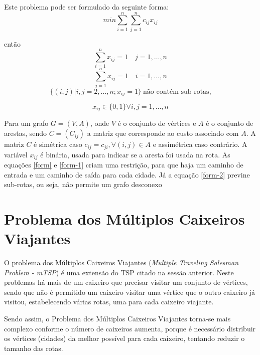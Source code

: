 \documentclass{abnt}
\begin{document}
		Este problema pode ser formulado da seguinte forma:
		\begin{equation}
 		   	min\sum_{i=1}^{n} \sum_{j=1}^{n} c_{ij} x_{ij}
		\end{equation}
		
		então		
		\begin{equation}
			\label{form}
 		   	\sum_{i=1}^{n} x_{ij} = 1 \quad j=1,\dots,n
		\end{equation}
		\begin{equation}
			\label{form-1}
 		   	\sum_{j=1}^{n} x_{ij} = 1 \quad i=1,\dots,n
		\end{equation}
		\begin{equation}
		\label{form-2}
 		   	\{(i,j)|i,j=2,\dots,n; x_{ij}=1\} ~\text{não contém sub-rotas,}
		\end{equation}
		
		\begin{equation}
		\label{form-3}
 		   	x_{ij} \in \{0,1\}\forall i,j=1,\dots,n
		\end{equation}
		
			
		Para um grafo  $G=(V,A)$, onde $V$ é o conjunto de vértices e $A$  é o conjunto de arestas, sendo $C = (C_{ij})$ a matriz que corresponde ao custo associado com $A$. A matriz $C$ é simétrica caso $c_{ij}=c_{ji},\forall(i,j) \in A$ e assimétrica caso contrário. A variável $x_{ij}$ é binária, usada para indicar se a aresta foi usada na rota. As equações \ref{form} e \ref{form-1} criam uma restrição, para que haja um caminho de entrada e um caminho de saída para cada cidade. Já a equação \ref{form-2} previne sub-rotas, ou seja, não permite um grafo desconexo \cite{dissertation}
	
	\section{Problema dos Múltiplos Caixeiros Viajantes}

		O problema dos Múltiplos Caixeiros Viajantes (\textit{Multiple Traveling Salesman Problem - mTSP}) é uma extensão do TSP citado na sessão anterior.
		Neste problemas há mais de um caixeiro que precisar visitar um conjunto de vértices, sendo que não é permitido um caixeiro visitar uma vértice que o outro caixeiro já visitou, estabelecendo várias rotas, uma para cada caixeiro viajante.

		Sendo assim, o Problema dos Múltiplos Caixeiros Viajantes torna-se  mais complexo conforme o número de caixeiros aumenta, porque é necessário distribuir os vértices (cidades) da melhor possível para cada caixeiro, tentando reduzir o tamanho das rotas. 
\end{document}
